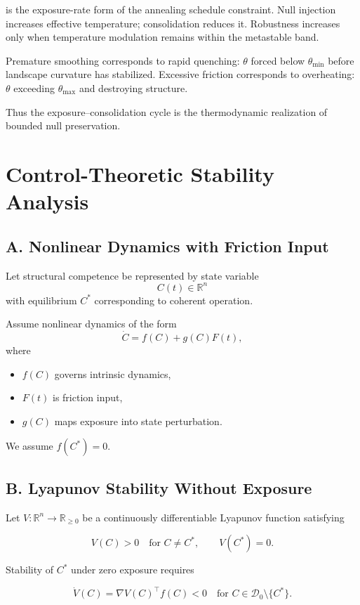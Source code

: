 \documentclass[11pt]{article}
\theoremstyle{remark}
\begin{document}
is the exposure-rate form of the annealing schedule constraint. Null injection increases effective temperature; consolidation reduces it. Robustness increases only when temperature modulation remains within the metastable band.

Premature smoothing corresponds to rapid quenching: $\theta$ forced below $\theta_{\min}$ before landscape curvature has stabilized. Excessive friction corresponds to overheating: $\theta$ exceeding $\theta_{\max}$ and destroying structure.

Thus the exposure--consolidation cycle is the thermodynamic realization of bounded null preservation.

\section{Control-Theoretic Stability Analysis}
\label{app:control}

\subsection*{A. Nonlinear Dynamics with Friction Input}

Let structural competence be represented by state variable
\[
C(t) \in \mathbb{R}^n
\]
with equilibrium $C^*$ corresponding to coherent operation.

Assume nonlinear dynamics of the form
\[
\dot{C} = f(C) + g(C) F(t),
\]
where
\begin{itemize}
\item $f(C)$ governs intrinsic dynamics,
\item $F(t)$ is friction input,
\item $g(C)$ maps exposure into state perturbation.
\end{itemize}

We assume $f(C^*) = 0$.

\subsection*{B. Lyapunov Stability Without Exposure}

Let $V : \mathbb{R}^n \to \mathbb{R}_{\ge 0}$ be a continuously differentiable Lyapunov function satisfying

\[
V(C) > 0 \quad \text{for } C \neq C^*, 
\qquad
V(C^*) = 0.
\]

Stability of $C^*$ under zero exposure requires

\[
\dot{V}(C)
=
\nabla V(C)^\top f(C)
<
0
\quad \text{for } C \in \mathcal{D}_0 \setminus \{C^*\}.
\]
\end{document}
